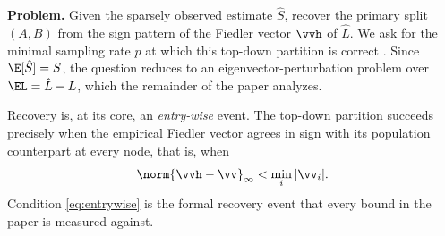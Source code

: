 \medskip
\noindent\textbf{Problem.} Given the sparsely observed estimate $\hat S$, recover
the primary split $(A,B)$ from the sign pattern of the Fiedler vector $\vvh$ of
$\hat L$. We ask for the minimal sampling rate $p$ at which this top-down partition
is correct \hp. Since $\E[\hat S]=S$, the question reduces to an
eigenvector-perturbation problem over $\EL=\hat L-L$, which the remainder of the
paper analyzes.

\medskip
Recovery is, at its core, an \emph{entry-wise} event. The top-down partition
succeeds precisely when the empirical Fiedler vector agrees in sign with its
population counterpart at every node, that is, when
\begin{equation}\label{eq:entrywise}
   \norm{\vvh-\vv}_\infty<\min_i|\vv_i|.
\end{equation}
Condition \eqref{eq:entrywise} is the formal recovery event that every bound in
the paper is measured against.
